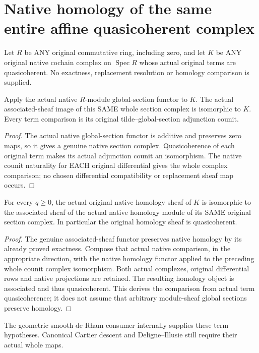 \section{Native homology of the same entire affine quasicoherent complex}
\label{sec:affine-quasicoherent-complex-homology}

Let $R$ be ANY original commutative ring, including zero, and
let $K$ be ANY original native cochain complex on
$\operatorname{Spec}R$ whose actual original terms are
quasicoherent. No exactness, replacement resolution or
homology comparison is supplied.

\begin{lemma}
\label{lem:affine-quasicoherent-whole-counit-complex}
\leanok
{}
Apply the actual native $R$-module global-section functor to
$K$. The actual associated-sheaf image of this SAME whole
section complex is isomorphic to $K$. Every term comparison
is its original tilde--global-section adjunction counit.
\end{lemma}
\begin{proof}
The actual native global-section functor is additive and
preserves zero maps, so it gives a genuine native section
complex. Quasicoherence of each original term makes its
actual adjunction counit an isomorphism. The native counit
naturality for EACH original differential gives the whole
complex comparison; no chosen differential compatibility
or replacement sheaf map occurs.
\end{proof}

\begin{proposition}
\label{prop:affine-quasicoherent-complex-original-homology}
\leanok
{}
For every $q\geq0$, the actual original native homology sheaf
of $K$ is isomorphic to the associated sheaf of the actual
native homology module of its SAME original section complex.
In particular the original homology sheaf is quasicoherent.
\end{proposition}
\begin{proof}
The genuine associated-sheaf functor preserves native
homology by its already proved exactness. Compose that
actual native comparison, in the appropriate direction,
with the native homology functor applied to the preceding
whole counit complex isomorphism. Both actual complexes,
original differential rows and native projections are
retained. The resulting homology object is associated and
thus quasicoherent. This derives the comparison from actual
term quasicoherence; it does not assume that arbitrary
module-sheaf global sections preserve homology.
\end{proof}

The geometric smooth de Rham consumer internally supplies
these term hypotheses. Canonical Cartier descent and
Deligne--Illusie still require their actual whole maps.

